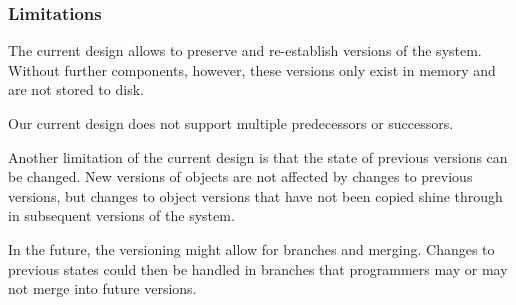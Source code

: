 \subsubsection{Limitations}

The current design allows to preserve and re-establish versions of the system.
Without further components, however, these versions only exist in memory and are not stored to disk.

Our current design does not support multiple predecessors or successors.

Another limitation of the current design is that the state of previous versions can be changed.
New versions of objects are not affected by changes to previous versions, but changes to object versions that have not been copied shine through in subsequent versions of the system.

In the future, the versioning might allow for branches and merging.
Changes to previous states could then be handled in branches that programmers may or may not merge into future versions.
